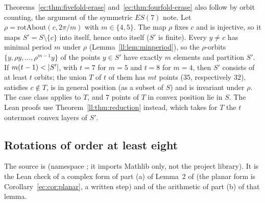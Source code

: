 \begin{remark}\label{ec:rem:orbits}
Theorems~\ref{ec:thm:fivefold-erase} and~\ref{ec:thm:fourfold-erase} also follow by orbit counting, the argument
of the symmetric $ES(7)$ note. Let $\rho=\mathrm{rotAbout}(c,2\pi/m)$ with $m\in\{4,5\}$. The map $\rho$ fixes $c$ and
is injective, so it maps $S'=S\setminus\{c\}$ into itself, hence onto itself ($S'$ is finite). Every $y\ne c$ has
minimal period $m$ under $\rho$ (Lemma~\ref{ll:lem:minperiod}), so the $\rho$-orbits $\{y,\rho y,\dots,\rho^{m-1}y\}$
of the points $y\in S'$ have exactly $m$ elements and partition $S'$. If $m(t-1)<\lvert S'\rvert$, with $t=7$ for $m=5$ and
$t=8$ for $m=4$, then $S'$ consists of at least $t$ orbits; the union $T$ of $t$ of them has $mt$ points ($35$,
respectively $32$), satisfies $c\notin T$, is in general position (as a subset of $S$) and is invariant under
$\rho$. The case class applies to $T$, and $7$ points of $T$ in convex position lie in $S$. The Lean proofs use
Theorem~\ref{ll:thm:reduction} instead, which takes for $T$ the $t$ outermost convex layers of $S'$.
\end{remark}

\subsection{Rotations of order at least eight}\label{ec:ssec:order8}

The source is  (namespace ; it imports Mathlib only, not the project
library). It is the Lean check of a complex form of part (a) of Lemma~2 of  (the planar
form is Corollary~\ref{ec:cor:planar}, a written step) and of the arithmetic of part (b) of that lemma.

